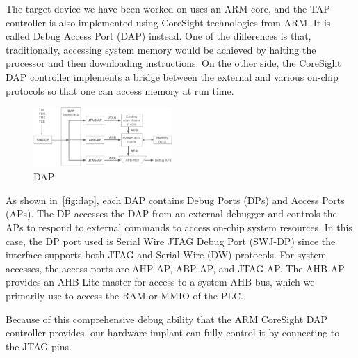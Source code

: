 The target device we have been worked on uses an ARM core, and the TAP controller is also implemented using CoreSight technologies from ARM. It is called Debug Access Port (DAP) instead. One of the differences is that, traditionally, accessing system memory would be achieved by halting the processor and then downloading instructions. On the other side, the CoreSight DAP controller implements a bridge between the external and various on-chip protocols so that one can access memory at run time. 

\begin{figure}[ht]
	\includegraphics[width=0.47\textwidth]{figures/dap}
	\centering
	\caption{DAP}
	\label{fig:dap}
\end{figure}

As shown in~\autoref{fig:dap}, each DAP contains Debug Ports (DPs) and Access Ports (APs). The DP  accesses the DAP from an external debugger and controls the APs to respond to external commands to access on-chip system resources. In this case, the DP port used is Serial Wire JTAG Debug Port (SWJ-DP) since the interface supports both JTAG and Serial Wire (DW) protocols.
For system accesses, the access ports are AHP-AP, ABP-AP, and JTAG-AP. The AHB-AP provides an AHB-Lite master for access to a system AHB bus, which we primarily use to access the RAM or MMIO of the PLC. 


Because of this comprehensive debug ability that the ARM CoreSight DAP controller provides, our hardware implant can fully control it by connecting to the JTAG pins.


